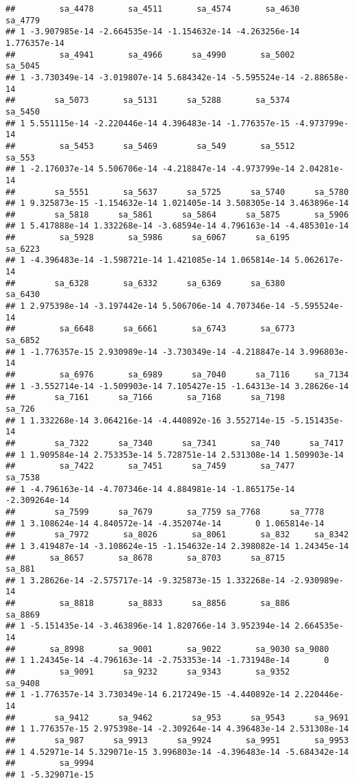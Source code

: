 \documentclass[]{article}
\begin{document}
\begin{verbatim}
##         sa_4478       sa_4511       sa_4574       sa_4630      sa_4779
## 1 -3.907985e-14 -2.664535e-14 -1.154632e-14 -4.263256e-14 1.776357e-14
##         sa_4941       sa_4966      sa_4990       sa_5002      sa_5045
## 1 -3.730349e-14 -3.019807e-14 5.684342e-14 -5.595524e-14 -2.88658e-14
##        sa_5073       sa_5131      sa_5288       sa_5374       sa_5450
## 1 5.551115e-14 -2.220446e-14 4.396483e-14 -1.776357e-15 -4.973799e-14
##         sa_5453      sa_5469        sa_549       sa_5512      sa_553
## 1 -2.176037e-14 5.506706e-14 -4.218847e-14 -4.973799e-14 2.04281e-14
##        sa_5551       sa_5637      sa_5725      sa_5740      sa_5780
## 1 9.325873e-15 -1.154632e-14 1.021405e-14 3.508305e-14 3.463896e-14
##        sa_5818      sa_5861      sa_5864      sa_5875       sa_5906
## 1 5.417888e-14 1.332268e-14 -3.68594e-14 4.796163e-14 -4.485301e-14
##         sa_5928       sa_5986      sa_6067      sa_6195      sa_6223
## 1 -4.396483e-14 -1.598721e-14 1.421085e-14 1.065814e-14 5.062617e-14
##        sa_6328       sa_6332      sa_6369      sa_6380       sa_6430
## 1 2.975398e-14 -3.197442e-14 5.506706e-14 4.707346e-14 -5.595524e-14
##         sa_6648      sa_6661       sa_6743       sa_6773      sa_6852
## 1 -1.776357e-15 2.930989e-14 -3.730349e-14 -4.218847e-14 3.996803e-14
##         sa_6976       sa_6989      sa_7040      sa_7116     sa_7134
## 1 -3.552714e-14 -1.509903e-14 7.105427e-15 -1.64313e-14 3.28626e-14
##        sa_7161      sa_7166       sa_7168      sa_7198        sa_726
## 1 1.332268e-14 3.064216e-14 -4.440892e-16 3.552714e-15 -5.151435e-14
##        sa_7322      sa_7340      sa_7341       sa_740      sa_7417
## 1 1.909584e-14 2.753353e-14 5.728751e-14 2.531308e-14 1.509903e-14
##         sa_7422       sa_7451      sa_7459       sa_7477       sa_7538
## 1 -4.796163e-14 -4.707346e-14 4.884981e-14 -1.865175e-14 -2.309264e-14
##        sa_7599      sa_7679       sa_7759 sa_7768      sa_7778
## 1 3.108624e-14 4.840572e-14 -4.352074e-14       0 1.065814e-14
##        sa_7972       sa_8026       sa_8061       sa_832     sa_8342
## 1 3.419487e-14 -3.108624e-15 -1.154632e-14 2.398082e-14 1.24345e-14
##       sa_8657       sa_8678       sa_8703      sa_8715        sa_881
## 1 3.28626e-14 -2.575717e-14 -9.325873e-15 1.332268e-14 -2.930989e-14
##         sa_8818       sa_8833      sa_8856       sa_886      sa_8869
## 1 -5.151435e-14 -3.463896e-14 1.820766e-14 3.952394e-14 2.664535e-14
##       sa_8998       sa_9001       sa_9022       sa_9030 sa_9080
## 1 1.24345e-14 -4.796163e-14 -2.753353e-14 -1.731948e-14       0
##         sa_9091      sa_9232      sa_9343       sa_9352      sa_9408
## 1 -1.776357e-14 3.730349e-14 6.217249e-15 -4.440892e-14 2.220446e-14
##        sa_9412      sa_9462        sa_953      sa_9543      sa_9691
## 1 1.776357e-15 2.975398e-14 -2.309264e-14 4.396483e-14 2.531308e-14
##        sa_987      sa_9913      sa_9924       sa_9951       sa_9953
## 1 4.52971e-14 5.329071e-15 3.996803e-14 -4.396483e-14 -5.684342e-14
##         sa_9994
## 1 -5.329071e-15
\end{verbatim}
\end{document}
